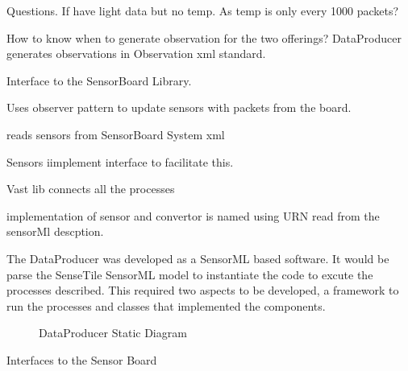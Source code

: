 \documentclass[]{final_report}
\begin{document}
Questions.
If have light data but no temp. As temp is only
every 1000 packets?

How to know when to generate observation
for the two offerings?
DataProducer generates observations in Observation xml standard.

Interface to the SensorBoard Library.

Uses observer pattern to update sensors with packets from the board.

reads sensors from SensorBoard System xml

Sensors iimplement interface to facilitate this.

Vast lib connects all the processes

implementation of sensor and convertor is named using URN read from the sensorMl descption.


The DataProducer was developed as a SensorML based software. It would be parse the SenseTile SensorML model to instantiate the code to excute the processes described. This required two aspects to be developed, a framework to run the processes and classes that implemented the components.

\begin{figure}[h]
\caption{DataProducer Static Diagram}\label{fig:bon_static_diagam_producer.png}
\end{figure}

Interfaces to the Sensor Board


\newpage
\end{document}

